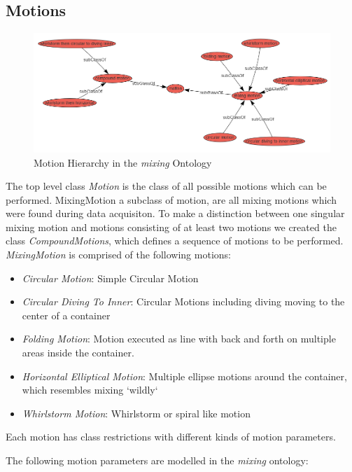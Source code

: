 \subsection{Motions}
\begin{figure}[H]
    \includegraphics[scale=0.45]{Graphics/classHierarchy/motions_hierarchy.png}
    \centering
    \caption{Motion Hierarchy in the \textit{mixing} Ontology}
\end{figure}

The top level class \textit{Motion} is the class of all possible motions which can be performed. MixingMotion a subclass of motion, are all mixing motions 
which were found during data acquisiton. To make a distinction between one singular mixing motion and motions consisting of at least two motions
we created the class \textit{CompoundMotions}, which defines a sequence of motions to be performed.
\textit{MixingMotion} is comprised of the following motions:

\begin{itemize}
    \item \textit{Circular Motion}: Simple Circular Motion
    \item \textit{Circular Diving To Inner}: Circular Motions including diving moving to the center of a container
    \item \textit{Folding Motion}: Motion executed as line with back and forth on multiple areas inside the container.
    \item \textit{Horizontal Elliptical Motion}: Multiple ellipse motions around the container, which resembles mixing `wildly`
    \item \textit{Whirlstorm Motion}: Whirlstorm or spiral like motion
\end{itemize}

Each motion has class restrictions with different kinds of motion parameters.

The following motion parameters are modelled in the \textit{mixing} ontology:

